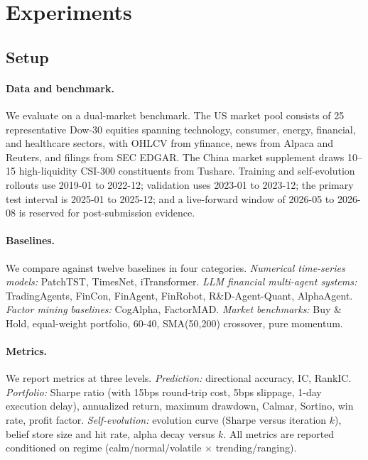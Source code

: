\section{Experiments}
\label{sec:experiments}

\subsection{Setup}

\paragraph{Data and benchmark.} We evaluate on a dual-market benchmark. The US market pool consists of 25 representative Dow-30 equities spanning technology, consumer, energy, financial, and healthcare sectors, with OHLCV from yfinance, news from Alpaca and Reuters, and filings from SEC EDGAR. The China market supplement draws 10--15 high-liquidity CSI-300 constituents from Tushare. Training and self-evolution rollouts use 2019-01 to 2022-12; validation uses 2023-01 to 2023-12; the primary test interval is 2025-01 to 2025-12; and a live-forward window of 2026-05 to 2026-08 is reserved for post-submission evidence.

\paragraph{Baselines.} We compare against twelve baselines in four categories. \emph{Numerical time-series models:} PatchTST, TimesNet, iTransformer. \emph{LLM financial multi-agent systems:} TradingAgents, FinCon, FinAgent, FinRobot, R\&D-Agent-Quant, AlphaAgent. \emph{Factor mining baselines:} CogAlpha, FactorMAD. \emph{Market benchmarks:} Buy \& Hold, equal-weight portfolio, 60-40, SMA(50,200) crossover, pure momentum.

\paragraph{Metrics.} We report metrics at three levels. \emph{Prediction:} directional accuracy, IC, RankIC. \emph{Portfolio:} Sharpe ratio (with 15bps round-trip cost, 5bps slippage, 1-day execution delay), annualized return, maximum drawdown, Calmar, Sortino, win rate, profit factor. \emph{Self-evolution:} evolution curve (Sharpe versus iteration $k$), belief store size and hit rate, alpha decay versus $k$. All metrics are reported conditioned on regime (calm/normal/volatile $\times$ trending/ranging).


